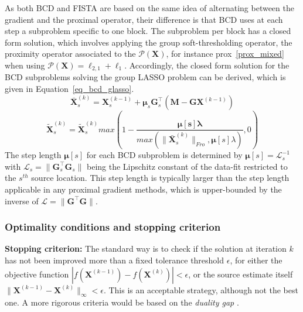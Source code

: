 As both BCD and FISTA are based on the same idea of alternating between the gradient and the proximal operator, their difference is that BCD uses at each step a subproblem specific to one block. The subproblem per block has a closed form solution, which involves applying the group soft-thresholding operator, the proximity operator associated to the $\mathcal{P}(\mathbf{X})$, for instance prox~\ref{prox_mixed} when using $\mathcal{P}(\mathbf{X}) = \ell_{2,1}+\ell_1$. Accordingly, the closed form solution for the BCD subproblems solving the group LASSO problem can be derived, which is given in Equation~\eqref{eq_bcd_glasso}.
\begin{equation*} \label{eq_bcd_glasso}
\bar{\mathbf{X}}_s^{(k)} = \mathbf{X}_s^{(k-1)}+\mathbf{\mu}_s\mathbf{G}^\top_s(\mathbf{M} - \mathbf{GX}^{(k-1)})
\end{equation*}
\begin{equation}
\tilde{\mathbf{X}}_s^{(k)} = \tilde{\mathbf{X}}_s^{(k)}max(1-\frac{\mathbf{\mu[s]\lambda}}{max(\|\bar{\mathbf{X}}_s^{(k)}\|_{Fro}, \mathbf{\mu}[s]\lambda)}, 0)
\end{equation}
The step length $\mathbf{\mu}[s]$ for each BCD subproblem is determined by $\mathbf{\mu}[s]=\mathcal{L}_s^{-1}$ with $\mathcal{L}_s=\|\mathbf{G}_s^\top\mathbf{G}_s\|$ being the Lipschitz constant of the data-fit restricted to the $s^{th}$ source location. This step length is typically larger than the step length applicable in any proximal gradient methods, which is upper-bounded by the inverse of $\mathcal{L} = \|\mathbf{G}^\top\mathbf{G}\|$.

\subsubsection*{Optimality conditions and stopping criterion}\label{section:duality_gap}

\textbf{Stopping criterion:} The standard way is to check if the solution at iteration $k$ has not been improved more than a fixed tolerance threshold $\epsilon$, for either the objective function $|f(\mathbf{X}^{(k-1)})-f(\mathbf{X}^{(k)})|<\epsilon$, or the source estimate itself $\|\mathbf{X}^{(k-1)}-\mathbf{X}^{(k)}\|_{\infty}<\epsilon$. This is an acceptable strategy, although not the best one. A more rigorous criteria would be based on the \textit{duality gap} \cite{boyd2004convex,bach2012optimization}.\\

